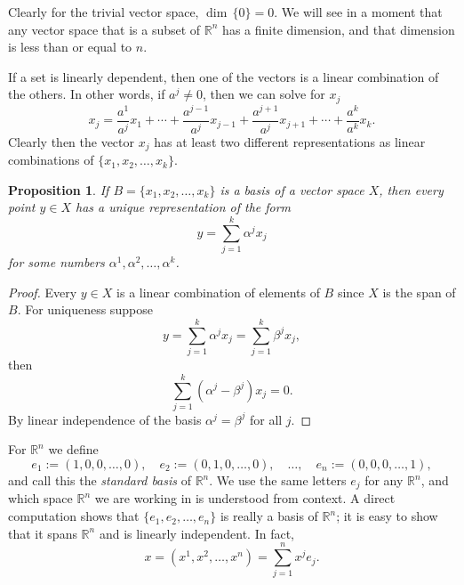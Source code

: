 \documentclass[12pt]{book}
\newcommand{\R}{{\mathbb{R}}}
\newcommand{\myindex}[1]{#1\index{#1}}
\theoremstyle{plain}
\newtheorem{prop}[thm]{Proposition}
\theoremstyle{remark}
\theoremstyle{definition}
\theoremstyle{exercise}
\theoremstyle{example}
\begin{document}
Clearly for the trivial vector space, $\dim \, \{ 0 \} = 0$.
We will see in a moment that any vector space that is a subset of $\R^n$
has a finite dimension, and that dimension is less than or equal to $n$.

If a set is linearly dependent, then one of the
vectors is a linear combination of the others.  In other words,
if $a^j \not= 0$, then we can solve for $x_j$
\begin{equation*}
x_j = \frac{a^1}{a^j} x_1 + \cdots + 
\frac{a^{j-1}}{a^j} x_{j-1} +
\frac{a^{j+1}}{a^j} x_{j+1} +
\cdots + 
\frac{a^k}{a^k} x_k .
\end{equation*}
Clearly then the vector $x_j$ has at least two different representations
as linear combinations of $\{ x_1,x_2,\ldots,x_k \}$.  

\begin{prop}
If $B = \{ x_1, x_2, \ldots, x_k \}$ is a basis of a vector space $X$, then
every point $y \in X$ has a unique representation of the form
\begin{equation*}
y = \sum_{j=1}^k \alpha^j x_j
\end{equation*}
for some numbers $\alpha^1, \alpha^2, \ldots, \alpha^k$.
\end{prop}

\begin{proof}
Every $y \in X$ is a linear combination of elements of $B$
since $X$ is the span of $B$.  For uniqueness
suppose
\begin{equation*}
y = \sum_{j=1}^k \alpha^j x_j = \sum_{j=1}^k \beta^j x_j ,
\end{equation*}
then
\begin{equation*}
\sum_{j=1}^k (\alpha^j-\beta^j) x_j = 0 .
\end{equation*}
By linear independence of the basis $\alpha^j = \beta^j$ for all $j$.
\end{proof}

For $\R^n$
we define
\begin{equation*}
e_1 := (1,0,0,\ldots,0) , \quad
e_2 := (0,1,0,\ldots,0) , \quad \ldots, \quad
e_n := (0,0,0,\ldots,1) ,
\end{equation*}
and call this the \emph{\myindex{standard basis}} of $\R^n$.
We use the same letters $e_j$ for any $\R^n$, and
which space $\R^n$ we are working in is understood from context.
A direct computation shows that $\{ e_1, e_2, \ldots, e_n \}$ is really
a basis of $\R^n$; it is easy to show that it spans $\R^n$ and is
linearly independent.  In fact,
\begin{equation*}
x = (x^1,x^2,\ldots,x^n) = \sum_{j=1}^n x^j e_j .
\end{equation*}
\end{document}
